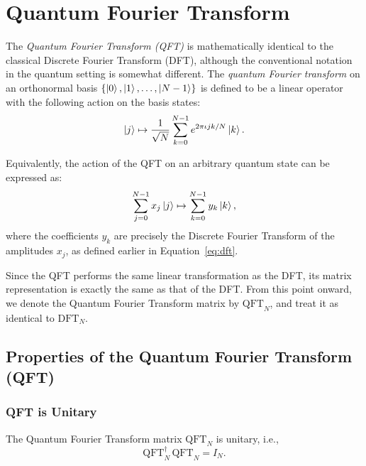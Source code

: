 \section{Quantum Fourier Transform}
\begin{definition}
The \textit{Quantum Fourier Transform (QFT)} is mathematically identical to the classical Discrete Fourier Transform (DFT), although the conventional notation in the quantum setting is somewhat different. The \textit{quantum Fourier transform} on an orthonormal basis \( \{ \ket{0}, \ket{1}, \dots, \ket{N-1} \} \) is defined to be a linear operator with the following action on the basis states:
\begin{equation}
    \ket{j} \mapsto \frac{1}{\sqrt{N}} \sum_{k=0}^{N-1} e^{2\pi\iota jk / N} \ket{k}.
    \label{eq:qft}
\end{equation}

Equivalently, the action of the QFT on an arbitrary quantum state can be expressed as:
\begin{equation}
    \sum_{j=0}^{N-1} x_j \ket{j} \mapsto \sum_{k=0}^{N-1} y_k \ket{k},
    \label{eq:qft_full}
\end{equation}
where the coefficients \( y_k \) are precisely the Discrete Fourier Transform of the amplitudes \( x_j \), as defined earlier in Equation~\eqref{eq:dft}.

Since the QFT performs the same linear transformation as the DFT, its matrix representation is exactly the same as that of the DFT. From this point onward, we denote the Quantum Fourier Transform matrix by \( \text{QFT}_N \), and treat it as identical to \( \text{DFT}_N \).
\end{definition}


\subsection{Properties of the Quantum Fourier Transform (QFT)}

\subsubsection{QFT is Unitary}

\begin{theorem}
The Quantum Fourier Transform matrix \( \text{QFT}_N \) is unitary, i.e.,
\begin{equation}
    \text{QFT}_N^\dagger \, \text{QFT}_N = I_N.
\end{equation}
\end{theorem}

